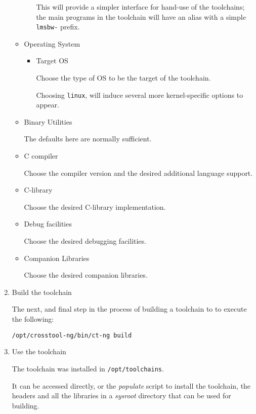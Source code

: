 \begin{enumerate}
\begin{itemize}
\begin{itemize}
          This will provide a simpler interface for hand-use of the
          toolchains; the main programs in the toolchain will have an
          alias with a simple \texttt{lmsbw-} prefix.

      \end{itemize}

    \item{Operating System}
      \begin{itemize}
      \item{Target OS}

        Choose the type of OS to be the target of the toolchain.

        Choosing \texttt{linux}, will induce several more
        kernel-specific options to appear.
      \end{itemize}

    \item{Binary Utilities}

      The defaults here are normally sufficient.

    \item{C compiler}

      Choose the compiler version and the desired additional language
      support.

    \item{C-library}

      Choose the desired C-library implementation.

    \item{Debug facilities}

      Choose the desired debugging facilities.

    \item{Companion Libraries}

      Choose the desired companion libraries.
    \end{itemize}
  \item Build the toolchain

    The next, and final step in the process of building a toolchain to
    to execute the following:

\begin{verbatim}
/opt/crosstool-ng/bin/ct-ng build
\end{verbatim}

   \item Use the toolchain

     The toolchain was installed in \texttt{/opt/toolchains}.

     It can be accessed directly, or the \emph{populate} script to
     install the toolchain, the headers and all the libraries in a
     \emph{sysroot} directory that can be used for building.

\end{enumerate}

